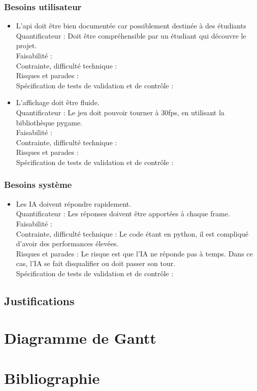 \documentclass{article}
\begin{document}
\subsubsection{Besoins utilisateur}
    \begin{itemize}
        \item L'api doit être bien documentée car possiblement destinée à des étudiants\\
            Quantificateur : Doit être compréhensible par un étudiant qui découvre le projet.\\
            Faisabilité : \\
            Contrainte, difficulté technique : \\
            Risques et parades : \\
            Spécification de tests de validation et de contrôle : \\

        \item L'affichage doit être fluide.\\
            Quantificateur : Le jeu doit pouvoir tourner à 30fps, en utilisant la bibliothèque pygame.\\
            Faisabilité : \\
            Contrainte, difficulté technique : \\
            Risques et parades : \\
            Spécification de tests de validation et de contrôle : \\

    \end{itemize}
\subsubsection{Besoins système}
    \begin{itemize}

        \item Les IA doivent répondre rapidement.\\
            Quantificateur : Les réponses doivent être apportées à chaque frame.\\
            Faisabilité : \\
            Contrainte, difficulté technique : Le code étant en python, il est compliqué d'avoir des performances élevées.\\
            Risques et parades : Le risque est que l'IA ne réponde pas à temps. Dans ce cas, l'IA se fait disqualifier ou doit passer son tour.\\
            Spécification de tests de validation et de contrôle : \\

    \end{itemize}

\subsection{Justifications}

\section{Diagramme de Gantt}

\section{Bibliographie}
    
\end{document}
